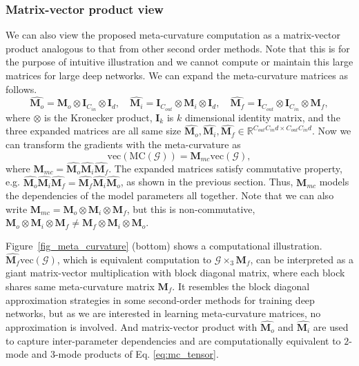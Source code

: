 \documentclass{article}
\begin{document}
\subsubsection{Matrix-vector product view}
We can also view the proposed meta-curvature computation as a matrix-vector product analogous to that from other second order methods. Note that this is for the purpose of intuitive illustration and we cannot compute or maintain this large matrices for large deep networks. We can expand the meta-curvature matrices as follows.
\begin{equation}
\label{eq:mc_tensor_expand}
\widehat{\mathbf{M}_o} = \mathbf{M}_o \otimes \mathbf{I}_{C_{in}} \otimes \mathbf{I}_{d}, \quad \widehat{\mathbf{M}_i} = \mathbf{I}_{C_{out}} \otimes \mathbf{M}_i  \otimes \mathbf{I}_{d}, \quad
\widehat{\mathbf{M}_f} = \mathbf{I}_{C_{out}} \otimes \mathbf{I}_{C_{in}} \otimes \mathbf{M}_f,
\end{equation}
where $\otimes$ is the Kronecker product, $\mathbf{I}_k$ is $k$ dimensional identity matrix, and the three expanded matrices are all same size $\widehat{\mathbf{M}_o}, \widehat{\mathbf{M}_i}, \widehat{\mathbf{M}_f} \in \mathbb{R}^{C_{out}C_{in}d \times C_{out}C_{in}d}$. Now we can transform the gradients with the meta-curvature as
\begin{equation}
\textrm{vec}(\textrm{MC}(\mathcal{G}))= \mathbf{M}_{mc}\textrm{vec}(\mathcal{G}),
\end{equation}
where $\mathbf{M}_{mc}= \widehat{\mathbf{M}_o} \widehat{\mathbf{M}_i} \widehat{\mathbf{M}_f}$. The expanded matrices satisfy commutative property, e.g. $\widehat{\mathbf{M}_o} \widehat{\mathbf{M}_i} \widehat{\mathbf{M}_f} = \widehat{\mathbf{M}_f} \widehat{\mathbf{M}_i} \widehat{\mathbf{M}_o}$, as shown in the previous section. Thus, $\mathbf{M}_{mc}$ models the dependencies of the model parameters all together. Note that we can also write $\mathbf{M}_{mc} = \mathbf{M}_o \otimes \mathbf{M}_i \otimes \mathbf{M}_f$, but this is non-commutative, $\mathbf{M}_o \otimes \mathbf{M}_i \otimes \mathbf{M}_f \neq \mathbf{M}_f \otimes \mathbf{M}_i \otimes \mathbf{M}_o$.

Figure~\ref{fig_meta_curvature} (bottom) shows a computational illustration. $\widehat{\mathbf{M}_f}\textrm{vec}(\mathcal{G})$, which is equivalent computation to $\mathcal{G} \times_3 \mathbf{M}_f$, can be interpreted as a giant matrix-vector multiplication with block diagonal matrix, where each block shares same meta-curvature matrix $\mathbf{M}_f$. It resembles the block diagonal approximation strategies in some second-order methods for training deep networks, but as we are interested in learning meta-curvature matrices, no approximation is involved. And matrix-vector product with $\widehat{\mathbf{M}_o}$ and $\widehat{\mathbf{M}_i}$ are used to capture inter-parameter dependencies and are computationally equivalent to $2$-mode and $3$-mode products of Eq. \ref{eq:mc_tensor}.
\end{document}
